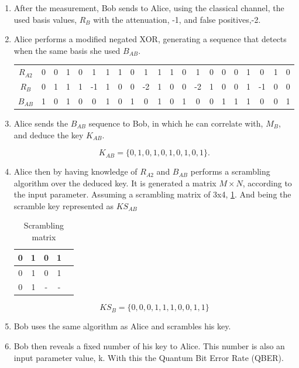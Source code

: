 \begin{enumerate}
	\item After the measurement, Bob sends to Alice, using the classical channel, the used basis values, $R_{B}$ with the attenuation, -1, and false positives,-2.
	\item Alice performs a modified negated XOR, generating a sequence that detects when the same basis she used $B_{AB}$.
	
	\begin{table}[H]
		\centering
		\begin{tabular}{c|c c c c c c c c c c c c c c c c c c c c}
			$R_{A2}$ & 0 & 0 & 1 & 0 &  1 & 1 & 1 & 0 &  1 & 1 & 1 & 0 &  1 & 0 & 0 & 0 & 1 &  0 & 1 & 0 \\
			$R_{B}$  & 0 & 1 & 1 & 1 & -1 & 1 & 0 & 0 & -2 & 1 & 0 & 0 & -2 & 1 & 0 & 0 & 1 & -1 & 0 & 0 \\ \hline
			$B_{AB}$ & 1 & 0 & 1 & 0 &  0 & 1 & 0 & 1 &  0 & 1 & 0 & 1 &  0 & 0 & 1 & 1 & 1 &  0 & 0 & 1 \\
		\end{tabular}
	\end{table}

	\item Alice sends the $B_{AB}$ sequence to Bob, in which he can correlate with, $M_{B}$, and deduce the key $K_{AB}$.
	
			$$ K_{AB} = \{0,1,0,1,0,1,0,1,0,1\}.$$
	
	\item Alice then by having knowledge of $R_{A2}$ and $B_{AB}$ performs a scrambling algorithm over the deduced key. It is generated a matrix $M \times N$, according to the input parameter. Assuming a scrambling matrix of 3x4, \ref{tb:scram}. And being the scramble key represented as $KS_{AB}$
	
	\begin{table}[hbt]
		\centering
		\caption{Scrambling matrix}
		\label{tb:scram}
		\begin{tabular}{|c|c|c|c|c|}
			\hline
				0 & 1 & 0 & 1 \\ \hline
			    0 & 1 & 0 & 1 \\ \hline
				0 & 1 & - & - \\ \hline
		\end{tabular}
	\end{table}

	$$KS_{B} = \{0,0,0,1,1,1,0,0,1,1\}$$	
	
	\item Bob uses the same algorithm as Alice and scrambles his key.
	
	\item Bob then reveals a fixed number of his key to Alice. This number is also an input parameter value, k. With this the Quantum Bit Error Rate (QBER).
		
\end{enumerate}

